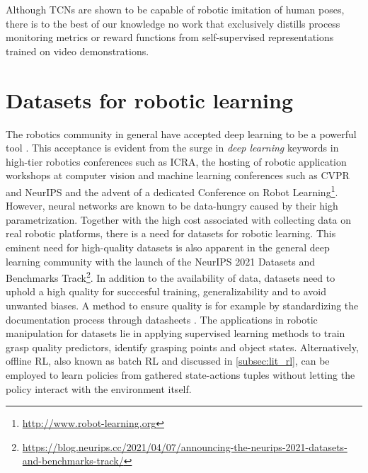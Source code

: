 \documentclass[\home/main.tex]{subfiles}
\begin{document}
Although \glspl{TCN} are shown to be capable of robotic imitation of human poses, there is to the best of our knowledge no work that exclusively distills process monitoring metrics or reward functions from self-supervised representations trained on video demonstrations. %


\section{Datasets for robotic learning} \label{sec:lit_datasets}
The robotics community in general have accepted deep learning to be a powerful tool \autocite{Sunderhauf2018}. This acceptance is evident from the surge in \textit{deep learning} keywords in high-tier robotics conferences such as ICRA, the hosting of robotic application workshops at computer vision and machine learning conferences such as CVPR \autocite{angelova2017computer} and NeurIPS \autocite{Posner2017} and the advent of a dedicated Conference on Robot Learning\footnote{\url{http://www.robot-learning.org}}. However, neural networks are known to be data-hungry caused by their high parametrization. Together with the high cost associated with collecting data on real robotic platforms, there is a need for datasets for robotic learning. This eminent need for high-quality datasets is also apparent in the general deep learning community with the launch of the NeurIPS 2021 Datasets and Benchmarks Track\footnote{\url{https://blog.neurips.cc/2021/04/07/announcing-the-neurips-2021-datasets-and-benchmarks-track/}}. In addition to the availability of data, datasets need to uphold a high quality for succcesful training, generalizability and to avoid unwanted biases. A method to ensure quality is for example by standardizing the documentation process through datasheets \autocite{gebru2018datasheets}.
The applications in robotic manipulation for datasets lie in applying supervised learning methods to train grasp quality predictors, identify grasping points and object states. Alternatively, offline RL, also known as batch RL and discussed in \cref{subsec:lit_rl}, can be employed to learn policies from gathered state-actions tuples without letting the policy interact with the environment itself.
\end{document}
